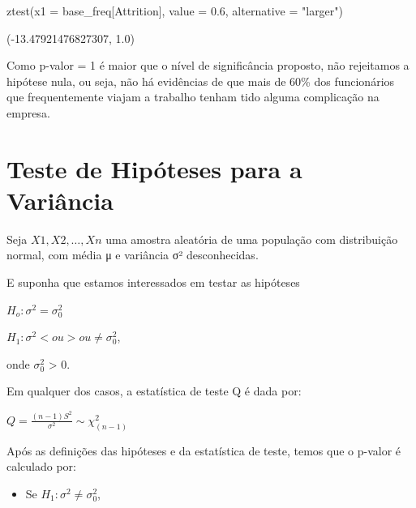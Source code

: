 \documentclass[
  letterpaper,
  DIV=11,
  numbers=noendperiod]{scrreprt}
\newenvironment{Shaded}{\begin{snugshade}}{\end{snugshade}}
\newcommand{\FloatTok}[1]{\textcolor[rgb]{0.68,0.00,0.00}{#1}}
\newcommand{\NormalTok}[1]{\textcolor[rgb]{0.00,0.23,0.31}{#1}}
\newcommand{\OperatorTok}[1]{\textcolor[rgb]{0.37,0.37,0.37}{#1}}
\newcommand{\StringTok}[1]{\textcolor[rgb]{0.13,0.47,0.30}{#1}}
\providecommand{\tightlist}{%
  \setlength{\itemsep}{0pt}\setlength{\parskip}{0pt}}\usepackage{longtable,booktabs,array}
\begin{document}
\begin{Shaded}
\begin{Highlighting}[]
\NormalTok{ztest(x1 }\OperatorTok{=}\NormalTok{ base\_freq[}\StringTok{\textquotesingle{}Attrition\textquotesingle{}}\NormalTok{], value }\OperatorTok{=} \FloatTok{0.6}\NormalTok{, alternative }\OperatorTok{=} \StringTok{"larger"}\NormalTok{)}
\end{Highlighting}
\end{Shaded}

\begin{tcolorbox}[enhanced jigsaw, breakable, leftrule=.75mm, left=2mm, opacityback=0, bottomrule=.15mm, toprule=.15mm, rightrule=.15mm, arc=.35mm, colback=white]

(-13.47921476827307, 1.0)

\end{tcolorbox}

Como p-valor = 1 é maior que o nível de significância proposto, não
rejeitamos a hipótese nula, ou seja, não há evidências de que mais de
60\% dos funcionários que frequentemente viajam a trabalho tenham tido
alguma complicação na empresa.

\hypertarget{teste-de-hipuxf3teses-para-a-variuxe2ncia}{%
\section{Teste de Hipóteses para a
Variância}\label{teste-de-hipuxf3teses-para-a-variuxe2ncia}}

Seja \(X1, X2,…,Xn\) uma amostra aleatória de uma população com
distribuição normal, com média μ e variância σ² desconhecidas.

E suponha que estamos interessados em testar as hipóteses

\(H_{o}: \sigma^{2} = \sigma^{2}_{0}\)

\(H_{1}: \sigma^{2} < ou > ou \neq \sigma^{2}_{0}\),

onde \(σ_{0}^{2}\) \textgreater{} 0.

Em qualquer dos casos, a estatística de teste Q é dada por:

\(Q = \frac{(n-1)S^{2}}{\sigma^{2}}\sim \chi^{2}_{(n-1)}\)

Após as definições das hipóteses e da estatística de teste, temos que o
p-valor é calculado por:

\begin{itemize}
\tightlist
\item
  Se \(H_{1}: \sigma^{2} \neq \sigma^{2}_{0}\),
\end{itemize}
\end{document}
